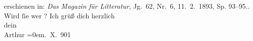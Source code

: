 \begin{ledgroupsized}[t]{13cm}
{{{                     erschienen in: \emph{Das Magazin für Litteratur},
                     Jg. 62, Nr. 6, 11. 2. 1893, Sp. 93–95.}}}\label{K_L01183-6h}. Wird ſie wer
                  \label{K_L01183-7v}\label{K_L01183-7h}? \pend
           \pstart
           Ich grüß dich herzlich{\\[\baselineskip]}dein{\\[\baselineskip]}\spacefill\mbox{Arthur}\pend
           \leftskip=0em{}. X. 901\pend
           
         
         \endnumbering{}\end{ledgroupsized}  \newcommand{\dateiname}{L01183}\newcommand{\titel}{Arthur Schnitzler an Hermann Bahr, 26. 10. 1901}\newcommand{\editorInnen}{ Kurt Ifkovits,  Martin Anton Müller}
      